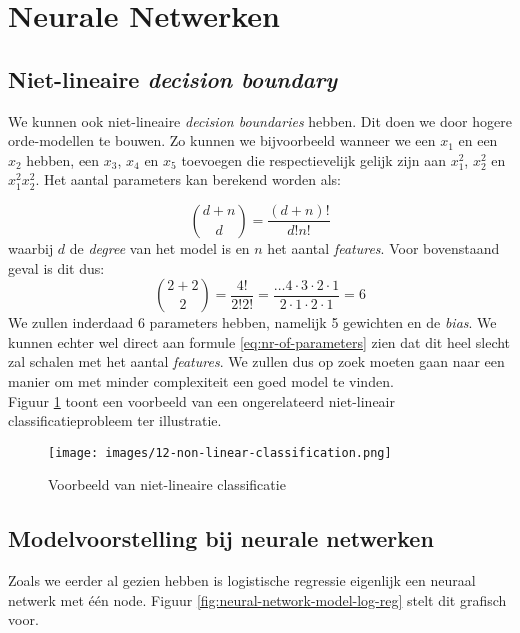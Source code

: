 \section{Neurale Netwerken}

\subsection{Niet-lineaire \textit{decision boundary}}

We kunnen ook niet-lineaire \textit{decision boundaries} hebben. Dit doen we door hogere orde-modellen te bouwen. Zo kunnen we bijvoorbeeld wanneer we een $x_{1}$ en een $x_{2}$ hebben, een $x_{3}$, $x_{4}$ en $x_{5}$ toevoegen die respectievelijk gelijk zijn aan $x_{1}^{2}$, $x_{2}^{2}$ en $x_{1}^{2} x_{2}^{2}$. Het aantal parameters kan berekend worden als:

\begin{equation}
	{d + n \choose d} = \frac{(d+n)!}{d! n!}
	\label{eq:nr-of-parameters}
\end{equation}
\noindent
waarbij $d$ de \textit{degree} van het model is en $n$ het aantal \textit{features}. Voor bovenstaand geval is dit dus: 
\begin{equation*}
	{2 + 2 \choose 2} = \frac{4!}{2! 2!} = \frac{\ldots4\cdot 3\cdot 2\cdot 1}{2\cdot 1\cdot 2\cdot 1} = 6
\end{equation*}
\newpage
\noindent
We zullen inderdaad 6 parameters hebben, namelijk 5 gewichten en de \textit{bias}. We kunnen echter wel direct aan formule \ref{eq:nr-of-parameters} zien dat dit heel slecht zal schalen met het aantal \textit{features}. We zullen dus op zoek moeten gaan naar een manier om met minder complexiteit een goed model te vinden. \\
\newline
Figuur \ref{fig:non-linear-classification} toont een voorbeeld van een ongerelateerd niet-lineair classificatieprobleem ter illustratie.
\begin{figure}[h]
	\centering
	\texttt{[image: images/12-non-linear-classification.png]}
	\caption{Voorbeeld van niet-lineaire classificatie}
	\label{fig:non-linear-classification}
\end{figure}

\subsection{Modelvoorstelling bij neurale netwerken}

Zoals we eerder al gezien hebben is logistische regressie eigenlijk een neuraal netwerk met één node. Figuur \ref{fig:neural-network-model-log-reg} stelt dit grafisch voor. 

